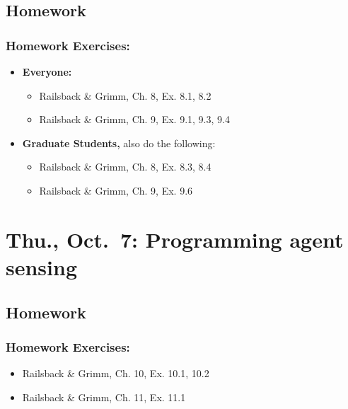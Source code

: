\documentclass[
]{article}
\providecommand{\tightlist}{%
  \setlength{\itemsep}{0pt}\setlength{\parskip}{0pt}}
\begin{document}
\hypertarget{homework-8}{%
\subsection{Homework}\label{homework-8}}

\hypertarget{homework-exercises-8}{%
\subsubsection{Homework Exercises:}\label{homework-exercises-8}}

\begin{itemize}
\tightlist
\item
  \textbf{Everyone:}

  \begin{itemize}
  \tightlist
  \item
    Railsback \& Grimm, Ch. 8, Ex. 8.1, 8.2
  \item
    Railsback \& Grimm, Ch. 9, Ex. 9.1, 9.3, 9.4
  \end{itemize}
\item
  \textbf{Graduate Students,} also do the following:

  \begin{itemize}
  \tightlist
  \item
    Railsback \& Grimm, Ch. 8, Ex. 8.3, 8.4
  \item
    Railsback \& Grimm, Ch. 9, Ex. 9.6
  \end{itemize}
\end{itemize}

\hypertarget{thu.-oct.-7-programming-agent-sensing}{%
\section{Thu., Oct.~7: Programming agent
sensing}\label{thu.-oct.-7-programming-agent-sensing}}

\hypertarget{homework-9}{%
\subsection{Homework}\label{homework-9}}

\hypertarget{homework-exercises-9}{%
\subsubsection{Homework Exercises:}\label{homework-exercises-9}}

\begin{itemize}
\tightlist
\item
  Railsback \& Grimm, Ch. 10, Ex. 10.1, 10.2
\item
  Railsback \& Grimm, Ch. 11, Ex. 11.1
\end{itemize}
\end{document}
